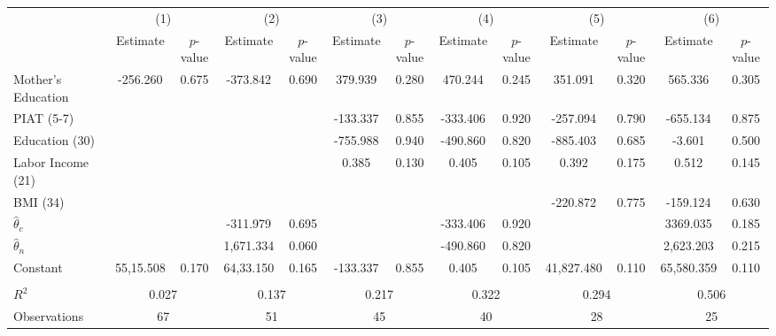 \begin{tabular}{lcccccccccccc} \toprule
 & \multicolumn{2}{c}{(1)}  &  \multicolumn{2}{c}{(2)}  &  \multicolumn{2}{c}{(3)}  &  \multicolumn{2}{c}{(4)}  & \multicolumn{2}{c}{(5)} & \multicolumn{2}{c}{(6)} \\  
 & Estimate & $p$-value & Estimate & $p$-value & Estimate & $p$-value & Estimate & $p$-value & Estimate & $p$-value & Estimate & $p$-value \\ \midrule
Mother's Education &  -256.260 &     0.675 &  -373.842 &     0.690 &   379.939 &     0.280 &   470.244 &     0.245 &   351.091 &     0.320 &   565.336 &     0.305 \\  
PIAT (5-7) &         &         &         &         &  -133.337 &     0.855 &  -333.406 &     0.920 &  -257.094 &     0.790 &  -655.134 &     0.875 \\  
Education (30) &         &         &         &         &  -755.988 &     0.940 &  -490.860 &     0.820 &  -885.403 &     0.685 &    -3.601 &     0.500 \\  
Labor Income (21) &         &         &         &         &     0.385 &     0.130 &     0.405 &     0.105 &     0.392 &     0.175 &     0.512 &     0.145 \\  
BMI (34) &         &         &         &         &         &         &         &         &  -220.872 &     0.775 &  -159.124 &     0.630 \\  
$\hat{\theta}_{c}$ &         &         &  -311.979 &     0.695 &         &         &  -333.406 &     0.920 &         &         &  3369.035 &     0.185 \\  
$\hat{\theta}_{n}$  &         &         &  1,671.334 &     0.060 &         &         &  -490.860 &     0.820 &         &         &  2,623.203 &     0.215 \\  
Constant &  55,15.508 &     0.170 &  64,33.150 &     0.165 &  -133.337 &     0.855 &     0.405 &     0.105 & 41,827.480 &     0.110 & 65,580.359 &     0.110 \\  \\ \midrule
$R^2$ &     \multicolumn{2}{c}{0.027}  &     \multicolumn{2}{c}{0.137}  &     \multicolumn{2}{c}{0.217}   &     \multicolumn{2}{c}{0.322}  &     \multicolumn{2}{c}{0.294}  &     \multicolumn{2}{c}{0.506}  \\  
Observations &    \multicolumn{2}{c}{67}  &    \multicolumn{2}{c}{51} &    \multicolumn{2}{c}{45}  &    \multicolumn{2}{c}{40} &    \multicolumn{2}{c}{28}  &   \multicolumn{2}{c}{25}  \\  
\bottomrule \end{tabular}